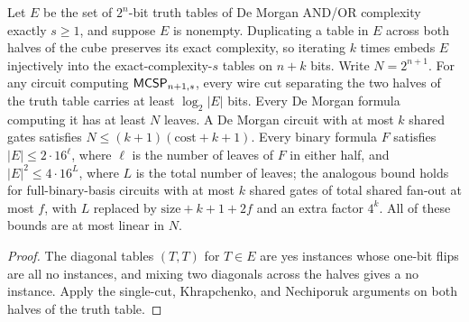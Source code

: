 \begin{theorem}
  \label{thm:lowerbounds-algebraic-mcsp-formula}
  \leanok
  Let $E$ be the set of $2^n$-bit truth tables of De Morgan AND/OR
  complexity exactly $s \ge 1$, and suppose $E$ is nonempty. Duplicating a
  table in $E$ across both halves of the cube preserves its exact complexity,
  so iterating $k$ times embeds $E$ injectively into the exact-complexity-$s$
  tables on $n + k$ bits. Write $N = 2^{n+1}$. For any circuit computing
  $\mathsf{MCSP}_{n+1,s}$, every wire cut separating the two halves of the truth
  table carries at least $\log_2 |E|$ bits. Every De Morgan formula computing
  it has at least $N$ leaves. A De Morgan circuit with at most $k$ shared
  gates satisfies $N \le (k+1)(\mathrm{cost} + k + 1)$. Every binary formula
  $F$ satisfies $|E| \le 2 \cdot 16^{\ell}$, where $\ell$ is the number of
  leaves of $F$ in either half, and $|E|^2 \le 4 \cdot 16^{L}$, where $L$ is
  the total number of leaves; the analogous bound holds for full-binary-basis
  circuits with at most $k$ shared gates of total shared fan-out at most $f$,
  with $L$ replaced by $\mathrm{size} + k + 1 + 2f$ and an extra factor
  $4^k$. All of these bounds are at most linear in $N$.
\end{theorem}
\begin{proof}
  \leanok
  The diagonal tables $(T, T)$ for $T \in E$ are yes instances whose one-bit
  flips are all no instances, and mixing two diagonals across the halves
  gives a no instance. Apply the single-cut, Khrapchenko, and Nechiporuk
  arguments on both halves of the truth table.
\end{proof}

